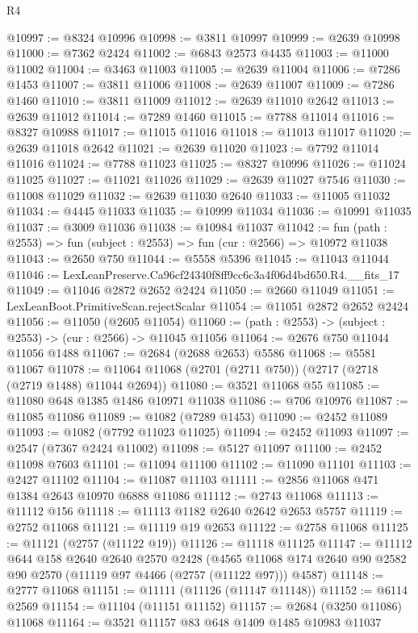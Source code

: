 \begin{lexlean}{R4}
\begin{coremodule}
@10997 := @8324 @10996
@10998 := @3811 @10997
@10999 := @2639 @10998
@11000 := @7362 @2424
@11002 := @6843 @2573 @4435
@11003 := @11000 @11002
@11004 := @3463 @11003
@11005 := @2639 @11004
@11006 := @7286 @1453
@11007 := @3811 @11006
@11008 := @2639 @11007
@11009 := @7286 @1460
@11010 := @3811 @11009
@11012 := @2639 @11010 @2642
@11013 := @2639 @11012
@11014 := @7289 @1460
@11015 := @7788 @11014
@11016 := @8327 @10988
@11017 := @11015 @11016
@11018 := @11013 @11017
@11020 := @2639 @11018 @2642
@11021 := @2639 @11020
@11023 := @7792 @11014 @11016
@11024 := @7788 @11023
@11025 := @8327 @10996
@11026 := @11024 @11025
@11027 := @11021 @11026
@11029 := @2639 @11027 @7546
@11030 := @11008 @11029
@11032 := @2639 @11030 @2640
@11033 := @11005 @11032
@11034 := @4445 @11033
@11035 := @10999 @11034
@11036 := @10991 @11035
@11037 := @3009 @11036
@11038 := @10984 @11037
@11042 := fun (path : @2553) => fun (subject : @2553) => fun (cur : @2566) => @10972 @11038
@11043 := @2650 @750
@11044 := @5558 @5396
@11045 := @11043 @11044
@11046 := LexLeanPreserve.Ca96cf24340f8ff9cc6c3a4f06d4bd650.R4.__fits_17
@11049 := @11046 @2872 @2652 @2424
@11050 := @2660 @11049
@11051 := LexLeanBoot.PrimitiveScan.rejectScalar
@11054 := @11051 @2872 @2652 @2424
@11056 := @11050 (@2605 @11054)
@11060 := (path : @2553) -> (subject : @2553) -> (cur : @2566) -> @11045 @11056
@11064 := @2676 @750 @11044 @11056 @1488
@11067 := @2684 (@2688 @2653) @5586
@11068 := @5581 @11067
@11078 := @11064 @11068 (@2701 (@2711 @750)) (@2717 (@2718 (@2719 @1488) @11044 @2694))
@11080 := @3521 @11068 @55
@11085 := @11080 @648 @1385 @1486 @10971 @11038
@11086 := @706 @10976
@11087 := @11085 @11086
@11089 := @1082 (@7289 @1453)
@11090 := @2452 @11089
@11093 := @1082 (@7792 @11023 @11025)
@11094 := @2452 @11093
@11097 := @2547 (@7367 @2424 @11002)
@11098 := @5127 @11097
@11100 := @2452 @11098 @7603
@11101 := @11094 @11100
@11102 := @11090 @11101
@11103 := @2427 @11102
@11104 := @11087 @11103
@11111 := @2856 @11068 @471 @1384 @2643 @10970 @6888 @11086
@11112 := @2743 @11068
@11113 := @11112 @156
@11118 := @11113 @1182 @2640 @2642 @2653 @5757
@11119 := @2752 @11068
@11121 := @11119 @19 @2653
@11122 := @2758 @11068
@11125 := @11121 (@2757 (@11122 @19))
@11126 := @11118 @11125
@11147 := @11112
    @644
    @158
    @2640
    @2640
    @2570
    @2428
    (@4565 @11068 @174 @2640 @90 @2582 @90 @2570 (@11119 @97 @4466 (@2757 (@11122 @97))) @4587)
@11148 := @2777 @11068
@11151 := @11111 (@11126 (@11147 @11148))
@11152 := @6114 @2569
@11154 := @11104 (@11151 @11152)
@11157 := @2684 (@3250 @11086) @11068
@11164 := @3521 @11157 @83 @648 @1409 @1485 @10983 @11037

\end{coremodule}
\end{lexlean}
